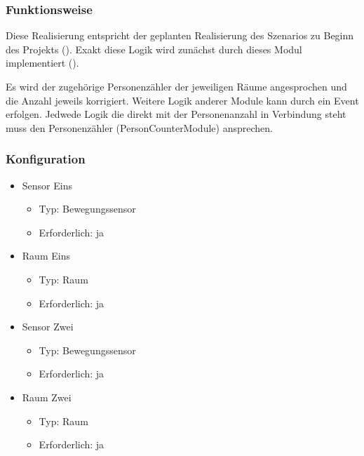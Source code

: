 \subsubsection{Funktionsweise}
Diese Realisierung entspricht der geplanten Realisierung des Szenarios zu Beginn des Projekts (). Exakt diese Logik wird zunächst durch dieses Modul implementiert ().

Es wird der zugehörige Personenzähler der jeweiligen Räume angesprochen und die Anzahl jeweils korrigiert. Weitere Logik anderer Module kann durch ein Event erfolgen. Jedwede Logik die direkt mit der Personenanzahl in Verbindung steht muss den Personenzähler (PersonCounterModule) ansprechen.

\subsubsection{Konfiguration}
\begin{itemize}
	\item Sensor Eins
	\begin{itemize}
		\item Typ: Bewegungssensor
		\item Erforderlich: ja
	\end{itemize}
	
	\item Raum Eins
	\begin{itemize}
		\item Typ: Raum
		\item Erforderlich: ja
	\end{itemize}

	\item Sensor Zwei
	\begin{itemize}
		\item Typ: Bewegungssensor
		\item Erforderlich: ja
	\end{itemize}
	
	\item Raum Zwei
	\begin{itemize}
		\item Typ: Raum
		\item Erforderlich: ja
	\end{itemize}
\end{itemize}

